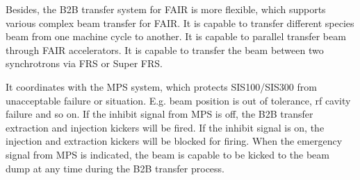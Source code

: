 Besides, the B2B transfer system for FAIR is more flexible, which supports various complex beam transfer for FAIR.  It is capable to transfer different species beam from one machine cycle to another.  It is capable to parallel transfer beam through FAIR accelerators. It is capable to transfer the beam between two synchrotrons via FRS or Super FRS. 

It coordinates with the MPS system, which protects SIS100/SIS300 from unacceptable failure or situation. E.g. beam position is out of tolerance, rf cavity failure and so on. If the inhibit signal from MPS is off, the B2B transfer extraction and injection kickers will be fired. If the inhibit signal is on, the injection and extraction kickers will be blocked for firing.  When the emergency signal from MPS is indicated, the beam is capable to be kicked to the beam dump at any time during the B2B transfer process.


%
%





